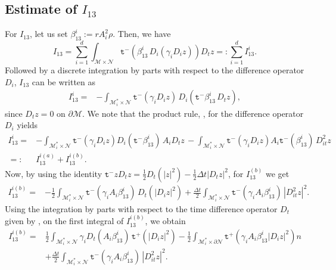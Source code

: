\documentclass[11pt,oneside,leqno]{amsart}
\numberwithin{equation}{section}
\numberwithin{equation}{section}
\newcommand{\trp}{\mathtt t^+}
\newcommand{\trm}{\mathtt t^-}
\begin{document}
\subsection{Estimate of $I_{13}$}
For $I_{13}$, let us set $\beta^{i}_{13}:=rA_{i}^{2}\rho$. Then, we have 
\begin{equation*}
I_{13}=\sum_{i=1}^{d}\int_{\mathcal{M}\times\mathcal{N}}\trm(\beta_{13}^{i}\,D_{i}(\gamma_{i}D_{i}z))D_{t}z=:\sum_{i=1}^{d}I^{i}_{13}.
\end{equation*}
Followed by a discrete integration by parts with respect to the difference operator $D_{i}$, $I_{13}$ can be written as
\begin{equation*}
\begin{split}
I^{i}_{13}=&-\int_{\mathcal{M}_{i}^{\ast}\times\mathcal{N}}\trm(\gamma_{i}D_{i}z)\,D_{i}(\trm\beta_{13}^{i}\,D_{t}z),
\end{split}
\end{equation*}
since $D_{t}z=0$ on $\partial\mathcal{M}$. We note that the product rule, \cite[Lemma 2.1]{LDOP-2021}, for the difference operator $D_{i}$ yields
\begin{equation*}
\begin{aligned}
    I_{13}^{i}=&-\int_{\mathcal{M}_{i}^{\ast}\times\mathcal{N}}\trm(\gamma_{i}D_{i}z)D_{i}(\trm\beta_{13}^{i})\,A_{i}D_{t}z\,-\int_{\mathcal{M}_{i}^{\ast}\times\mathcal{N}}\trm(\gamma_{i}D_{i}z)A_{i}\trm(\beta^{i}_{13})\,D_{it}^{2}z\\
    =:&I_{13}^{i(a)}+I_{13}^{i(b)}.
    \end{aligned}
\end{equation*}
Now, by using the identity $\trm zD_{t}z=\frac{1}{2}D_{t}(|z|^{2})-\frac{1}{2}\Delta t|D_{t}z|^{2}$, for $I_{13}^{(b)}$ we get
\begin{equation*}
\begin{split}
    I_{13}^{i(b)}=&-\frac{1}{2}\int_{\mathcal{M}_{i}^{\ast}\times\mathcal{N}}\trm(\gamma_{i}A_{i}\beta_{13}^{i})\,D_{t}(|D_{i}z|^{2})+\frac{\Delta t}{2}\int_{\mathcal{M}_{i}^{\ast}\times\mathcal{N}}\trm(\gamma_{i}A_{i}\beta_{13}^{i})\,|D_{it}^{2}z|^{2}.
    \end{split}
\end{equation*}
Using the integration by parts with respect to the time difference operator $D_{t}$ given by \cite[Proposition 2, equation (2.5)]{LMPZ:2023}, on the first integral of $I_{13}^{i(b)}$, we obtain
\begin{equation*}
\begin{aligned}
    I_{13}^{i(b)}=&\frac{1}{2}\int_{\mathcal{M}_{i}^{\ast}\times\mathcal{N}}\gamma_{i}D_{t}(A_{i}\beta_{13}^{i})\,\trp(|D_{i}z|^{2})-\frac{1}{2}\int_{\mathcal{M}_{i}^{\ast}\times\partial\mathcal{N}}\trp(\gamma_{i}A_{i}\beta_{13}^{i}|D_{i}z|^{2})n\\
    &+\frac{\Delta t}{2}\int_{\mathcal{M}_{i}^{\ast}\times\mathcal{N}}\trm(\gamma_{i}A_{i}\beta_{13}^{i})\,|D_{it}^{2}z|^{2}.
    \end{aligned}
\end{equation*}
\end{document}
